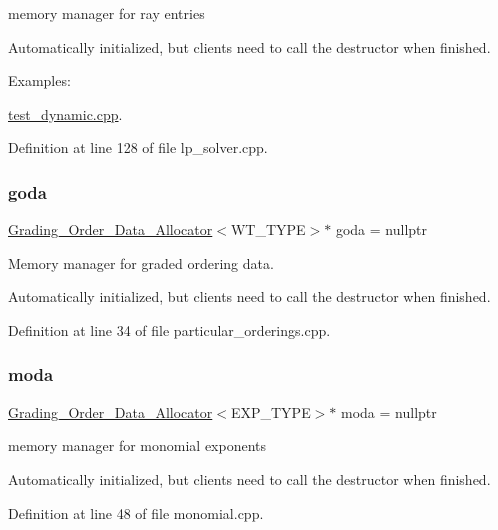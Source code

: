 memory manager for ray entries 

Automatically initialized, but clients need to call the destructor when finished. \begin{Desc}
\item[Examples\+: ]\par
\hyperlink{test_dynamic_8cpp-example}{test\+\_\+dynamic.\+cpp}.\end{Desc}


Definition at line 128 of file lp\+\_\+solver.\+cpp.

\mbox{\label{group__memorygroup_gadf1bccf09eada41d10a5d4ceda7ca479}} 
\subsubsection{\texorpdfstring{goda}{goda}}
{\footnotesize\ttfamily \hyperlink{group__memorygroup_class_grading___order___data___allocator}{Grading\+\_\+\+Order\+\_\+\+Data\+\_\+\+Allocator}$<$W\+T\+\_\+\+T\+Y\+PE$>$$\ast$ goda = nullptr}



Memory manager for graded ordering data. 

Automatically initialized, but clients need to call the destructor when finished. 

Definition at line 34 of file particular\+\_\+orderings.\+cpp.

\mbox{\label{group__memorygroup_gaf2c367d23e09c5dad7e0273995a3304c}} 
\subsubsection{\texorpdfstring{moda}{moda}}
{\footnotesize\ttfamily \hyperlink{group__memorygroup_class_grading___order___data___allocator}{Grading\+\_\+\+Order\+\_\+\+Data\+\_\+\+Allocator}$<$E\+X\+P\+\_\+\+T\+Y\+PE$>$$\ast$ moda = nullptr}



memory manager for monomial exponents 

Automatically initialized, but clients need to call the destructor when finished. 

Definition at line 48 of file monomial.\+cpp.

